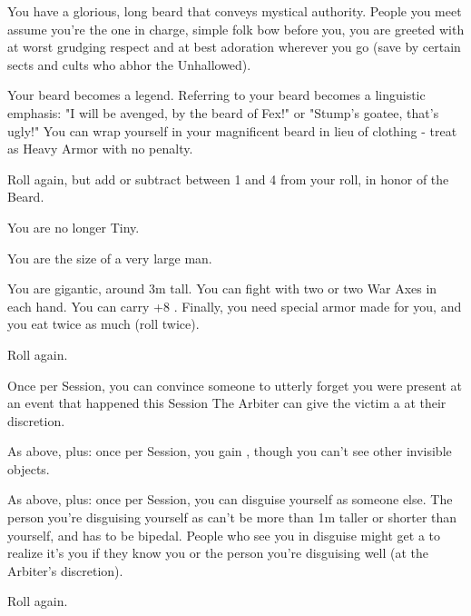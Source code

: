 \begin{multicols*}{2}
 You have a glorious, long beard that conveys mystical authority.  People you meet assume you're the one in charge, simple folk bow before you, you are greeted with at worst grudging respect and at best adoration wherever you go (save by certain sects and cults who abhor the Unhallowed).

 Your beard becomes a legend.  Referring to your beard becomes a linguistic emphasis:  "I will be avenged, by the beard of Fex!" or "Stump's goatee, that's ugly!" You can wrap yourself in your magnificent beard in lieu of clothing - treat as Heavy Armor with no \MD penalty.

 Roll again, but add or subtract between 1 and 4 from your roll, in honor of the Beard.

\NC[Name=Bigg'un]

  You are no longer Tiny.

  You are the size of a very large man.

  You are gigantic, around 3m tall.  You can fight  with two  or two War Axes in each hand.  You can carry +8 . Finally, you need special armor made for you, and you eat twice as much (roll  twice).

  Roll again. 

\cbreak

\NC[Name=Camo]

  Once per Session, you can convince someone to utterly forget you were present at an event that happened this Session  The Arbiter can give the victim a  at their discretion.

  As above, plus:  once per Session, you gain , though you can't see other invisible objects.

  As above, plus:  once per Session, you can disguise yourself as someone else.  The person you're disguising yourself as can't be more than 1m taller or shorter than yourself, and has to be bipedal.  People who see you in disguise might get a  to realize it's you if they know you or the person you're disguising well (at the Arbiter's discretion).

   Roll again. 

\NC[Name=Fishy]


\end{multicols*}
